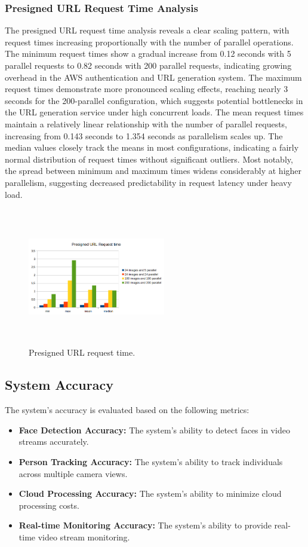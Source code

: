 \documentclass[conference]{IEEEtran}
\begin{document}
\subsubsection{Presigned URL Request Time Analysis}
The presigned URL request time analysis reveals a clear scaling pattern, with request times increasing proportionally with the number of parallel operations. The minimum request times show a gradual increase from 0.12 seconds with 5 parallel requests to 0.82 seconds with 200 parallel requests, indicating growing overhead in the AWS authentication and URL generation system. The maximum request times demonstrate more pronounced scaling effects, reaching nearly 3 seconds for the 200-parallel configuration, which suggests potential bottlenecks in the URL generation service under high concurrent loads. The mean request times maintain a relatively linear relationship with the number of parallel requests, increasing from 0.143 seconds to 1.354 seconds as parallelism scales up. The median values closely track the means in most configurations, indicating a fairly normal distribution of request times without significant outliers. Most notably, the spread between minimum and maximum times widens considerably at higher parallelism, suggesting decreased predictability in request latency under heavy load.
\begin{figure}[ht]
      \centering
      \includegraphics[width=6cm,height=6cm,keepaspectratio]{images/measurements_cloud/presigned_url_request_time.png}
      \caption{Presigned URL request time.}
      \label{presigned-url-request-time}
\end{figure}

\subsection{System Accuracy}
The system's accuracy is evaluated based on the following metrics:
\begin{itemize}
      \item \textbf{Face Detection Accuracy:} The system's ability to detect faces in video streams accurately.
      \item \textbf{Person Tracking Accuracy:} The system's ability to track individuals across multiple camera views.
      \item \textbf{Cloud Processing Accuracy:} The system's ability to minimize cloud processing costs.
      \item \textbf{Real-time Monitoring Accuracy:} The system's ability to provide real-time video stream monitoring.
\end{itemize}
\end{document}
